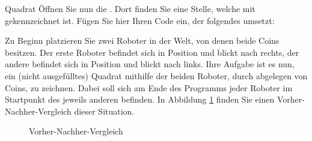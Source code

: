 \documentclass{../tuda-exercise}
\begin{document}
  \begin{task}[credit=\stars{2}{3}]{Quadrat}
    Öffnen Sie nun die . Dort finden Sie eine Stelle, welche mit
     gekennzeichnet ist. Fügen Sie hier Ihren Code ein, der folgendes umsetzt:

    \br

    Zu Beginn platzieren Sie zwei Roboter in der Welt, von denen beide  Coins
    besitzen. Der erste Roboter befindet sich in Position  und blickt nach
    rechts, der andere befindet sich in Position  und blickt nach links. Ihre
    Aufgabe ist es nun, ein (nicht ausgefülltes) Quadrat mithilfe der beiden Roboter, durch
    abgelegen von Coins, zu zeichnen. Dabei soll sich am Ende des Programms jeder Roboter im
    Startpunkt des jeweils anderen befinden. In Abbildung \ref{fig:V5} finden Sie einen
    Vorher-Nachher-Vergleich dieser Situation.

    \begin{figure}[h]
      \centering
      \caption{Vorher-Nachher-Vergleich}
      \label{fig:V5}
    \end{figure}


\end{task}
\end{document}
